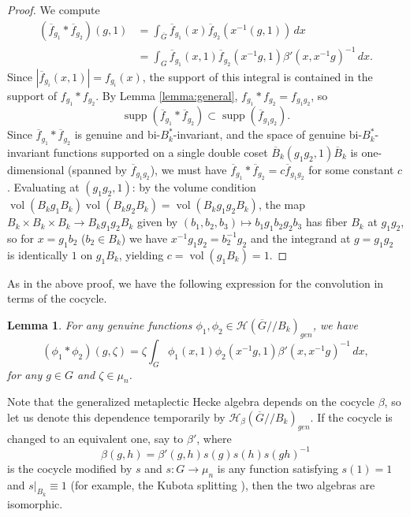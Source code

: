 \documentclass[12pt,letterpaper,reqno]{amsart}
\let\cal\mathcal
\newtheorem{lemma}[theorem]{Lemma}
\theoremstyle{definition}
\theoremstyle{remark}
\numberwithin{equation}{section}
\begin{document}
\begin{proof}
We compute
\[
\begin{aligned}
(\overline{f}_{g_1}*\overline{f}_{g_2})(g,1)
&=\int_{\overline{G}}
\overline{f}_{g_1}(x)\overline{f}_{g_2}(x^{-1}(g,1))\,dx\\
&=\int_{G}\overline{f}_{g_1}(x,1)\overline{f}_{g_2}(x^{-1}g,1)
\beta'(x,x^{-1}g)^{-1}\,dx.
\end{aligned}
\]
Since $|\overline{f}_{g_i}(x,1)|=f_{g_i}(x)$, the support of this integral is
contained in the support of $f_{g_1}*f_{g_2}$. By Lemma \ref{lemma:general},
$f_{g_1}*f_{g_2}=f_{g_1g_2}$, so
\[
\operatorname{supp}(\overline{f}_{g_1}*\overline{f}_{g_2})
\subset \operatorname{supp}(\overline{f}_{g_1g_2}).
\]
Since $\overline{f}_{g_1}*\overline{f}_{g_2}$ is genuine and bi-$B_k^*$-invariant,
and the space of genuine bi-$B_k^*$-invariant functions supported on a single
double coset $\overline{B}_k(g_1g_2,1)\overline{B}_k$ is one-dimensional
(spanned by $\overline{f}_{g_1g_2}$), we must have
$\overline{f}_{g_1}*\overline{f}_{g_2}=c\overline{f}_{g_1g_2}$ for some
constant $c$. Evaluating at $(g_1g_2,1)$: by the volume condition
$\operatorname{vol}(B_kg_1B_k)\operatorname{vol}(B_kg_2B_k)
=\operatorname{vol}(B_kg_1g_2B_k)$, the map
$B_k\times B_k\times B_k\rightarrow B_kg_1g_2B_k$ given by
$(b_1,b_2,b_3)\mapsto b_1g_1b_2g_2b_3$ has fiber $B_k$ at $g_1g_2$, so for
$x=g_1b_2$ ($b_2\in B_k$) we have $x^{-1}g_1g_2=b_2^{-1}g_2$ and the integrand
at $g=g_1g_2$ is identically $1$ on $g_1B_k$, yielding $c=\operatorname{vol}(g_1B_k)=1$.
\end{proof}

As in the above proof, we have the following expression for the convolution in
terms of the cocycle.

\begin{lemma}
\label{lemma:convolve}
For any genuine functions $\phi_1,\phi_2\in {\cal H}(\overline{G}//B_k)_{gen}$,
we have
\[
(\phi_1*\phi_2)(g,\zeta)
=\zeta\int_{G}\phi_1(x,1)\phi_2(x^{-1}g,1)
\beta'(x,x^{-1}g)^{-1}\,dx,
\]
for any $g\in G$ and $\zeta\in\mu_n$.
\end{lemma}

Note that the generalized metaplectic Hecke algebra depends on the cocycle
$\beta$, so let us denote this dependence temporarily by
${\cal H}_\beta(\overline{G}//B_k)_{gen}$. If the cocycle is changed to an
equivalent one, say to $\beta'$, where
\[
\beta(g,h)=\beta'(g,h)s(g)s(h)s(gh)^{-1}
\]
is the cocycle modified by $s$ and $s:G\rightarrow \mu_n$ is any function
satisfying $s(1)=1$ and $s|_{B_k}\equiv 1$ (for example, the Kubota splitting
\cite{Ku67,KP84}), then the two algebras are isomorphic.
\end{document}
